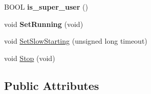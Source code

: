 \begin{DoxyCompactItemize}
$$\item 
\mbox{\label{classNTService_a121b1809898655ce7063c4f4a30d4f54}} 
B\+O\+OL {\bfseries is\+\_\+super\+\_\+user} ()
\item 
\mbox{\label{classNTService_ace83add65ff0bf3e73765dd4b5d4a577}} 
void {\bfseries Set\+Running} (void)
\item 
void \mbox{\hyperlink{classNTService_a5a2e4a86c43e059e2d7e0f5b28bb0d48}{Set\+Slow\+Starting}} (unsigned long timeout)
\item 
void \mbox{\hyperlink{classNTService_a58cffe68293f4919153cf798517d94f2}{Stop}} (void)
\end{DoxyCompactItemize}
\subsection*{Public Attributes}
